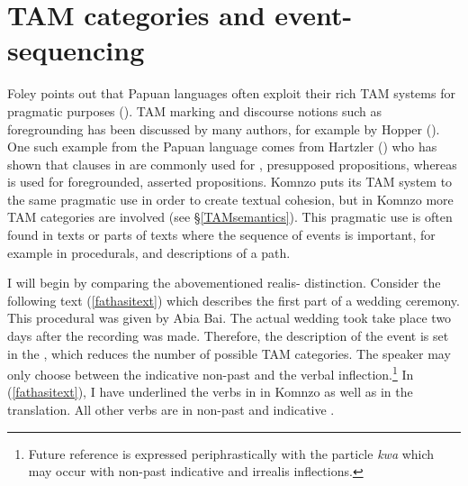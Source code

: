 \section{TAM categories and event-sequencing} \label{info-tam-event}

Foley points out that Papuan languages often exploit their rich TAM systems for pragmatic purposes (\citeyear[389]{Foley:2000uh}). TAM marking and discourse notions such as foregrounding has been discussed by many authors, for example by Hopper (\citeyear{Hopper:1979us}). One such example from the Papuan language  comes from Hartzler (\citeyear{Hartzler:1983wm}) who has shown that clauses in  are commonly used for , presupposed propositions, whereas  is used for foregrounded, asserted propositions. Komnzo puts its TAM system to the same pragmatic use in order to create textual cohesion, but in Komnzo more TAM categories are involved (see \S{}\ref{TAMsemantics}). This pragmatic use is often found in texts or parts of texts where the sequence of events is important, for example in procedurals, and descriptions of a path.%

I will begin by comparing the abovementioned realis- distinction. Consider the following text (\ref{fathasitext}) which describes the first part of a wedding ceremony. This procedural was given by Abia Bai. The actual wedding took take place two days after the recording was made. Therefore, the description of the event is set in the , which reduces the number of possible TAM categories. The speaker may only choose between the indicative non-past and the  verbal inflection.\footnote{Future reference is expressed periphrastically with the particle \emph{kwa} which may occur with non-past indicative and irrealis inflections.} In (\ref{fathasitext}), I have underlined the verbs in   in Komnzo as well as in the  translation. All other verbs are in non-past and indicative .

